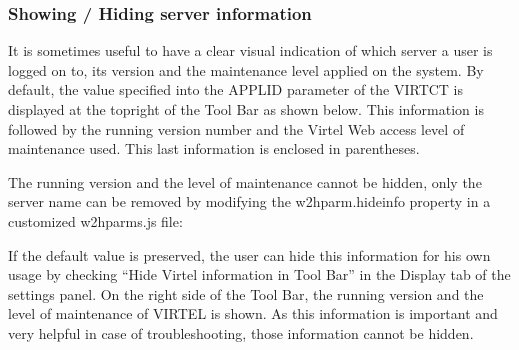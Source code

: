 \documentclass[letterpaper,10pt,english]{sphinxmanual}
\begin{document}
\sphinxAtStartPar
{}

\sphinxAtStartPar
{}

\ignorespaces 

\subsubsection{Showing / Hiding server information}
\label{\detokenize{Customization:showing-hiding-server-information}}\label{\detokenize{Customization:index-38}}
\sphinxAtStartPar
It is sometimes useful to have a clear visual indication of which server a user is logged on to, its version and the maintenance level applied on the system. By default, the value specified into the APPLID parameter of the VIRTCT is displayed at the top\sphinxhyphen{}right of the Tool Bar as shown below. This information is followed by the running version number and the Virtel Web access level of maintenance used. This last information is enclosed in parentheses.

\sphinxAtStartPar
{}

\sphinxAtStartPar
The running version and the level of maintenance cannot be hidden, only the server name can be  removed by modifying the w2hparm.hideinfo property in a customized w2hparms.js file:

\begin{sphinxVerbatim}[commandchars=\\\{\}]
       
  
\end{sphinxVerbatim}

\sphinxAtStartPar
{}

\sphinxAtStartPar
If the default value is preserved, the user can hide this information for his own usage by checking “Hide Virtel information in Tool Bar” in the Display tab of the settings panel. On the right side of the Tool Bar, the running version and the level of maintenance of VIRTEL is shown. As this information is important and very helpful in case of troubleshooting, those information cannot be hidden.
\end{document}
